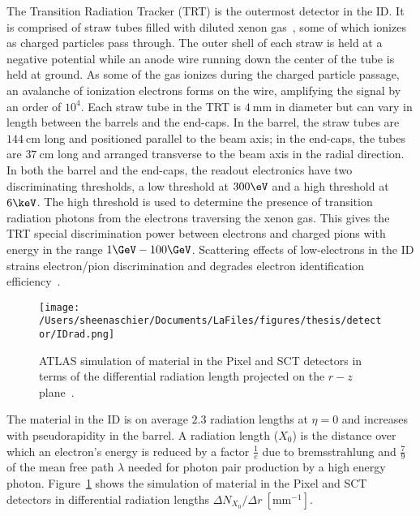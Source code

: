 The Transition Radiation Tracker (TRT) is the outermost detector in the ID.  It is comprised of straw tubes filled with diluted xenon gas~\cite{Mitsou:2003rp}, some of which ionizes as charged particles pass through.   The outer shell of each straw is held at a negative potential while an anode wire running down the center of the tube is held at ground.  As some of the gas ionizes during the charged particle passage, an avalanche of ionization electrons forms on the wire, amplifying the signal by an order of $10^4$. Each straw tube in the TRT is $4~\mathrm{mm}$ in diameter but can vary in length between the barrels and the end-caps.  In the barrel, the straw tubes are $144~\mathrm{cm}$ long and positioned parallel to the beam axis; in the end-caps, the tubes are $37~\mathrm{cm}$ long and arranged transverse to the beam axis in the radial direction.  %
In both the barrel and the end-caps, the readout electronics have two discriminating thresholds, a low threshold at $300\eV$ and a high threshold at $6\keV$.  The high threshold is used to determine the presence of transition radiation photons from the electrons traversing the xenon gas.  This gives the TRT special discrimination power between electrons and charged pions with energy in the range $1\GeV - 100\GeV$.  Scattering effects of low-\pt electrons in the ID strains electron/pion discrimination and degrades electron identification efficiency~\cite{MINDUR2017257}.  

  \begin{figure}[tbp]
  \centering
 \texttt{[image: /Users/sheenaschier/Documents/LaFiles/figures/thesis/detector/IDrad.png]}
    \caption{ATLAS simulation of material in the Pixel and SCT detectors in terms of the differential radiation length projected on the $r-z$ plane~\cite{Aaboud:2017pjd}.}
   \label{fig:IDmat}
 \end{figure}
 The material in the ID is on average $2.3$ radiation lengths at $\eta=0$ and increases with pseudorapidity in the barrel.  A radiation length ($X_0$) is the distance over which an electron's energy is reduced by a factor $\frac{1}{e}$ due to bremsstrahlung and $\frac{7}{9}$ of the mean free path $\lambda$ needed for photon pair production by a high energy photon.  Figure~\ref{fig:IDmat} shows the simulation of material in the Pixel and SCT detectors in differential radiation lengths $\Delta N_{X_0}/\Delta r~[\mathrm{mm}^{-1}]$.
\FloatBarrier

